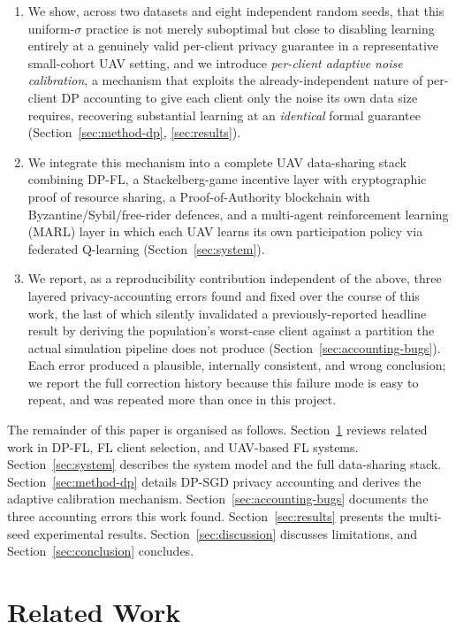 \documentclass[journal]{IEEEtran}
\begin{document}
\begin{enumerate}
\item We show, across two datasets and eight independent random seeds,
that this uniform-$\sigma$ practice is not merely suboptimal but close
to disabling learning entirely at a genuinely valid per-client privacy
guarantee in a representative small-cohort UAV setting, and we
introduce \emph{per-client adaptive noise calibration}, a mechanism
that exploits the already-independent nature of per-client DP
accounting to give each client only the noise its own data size
requires, recovering substantial learning at an \emph{identical} formal
guarantee (Section~\ref{sec:method-dp}, \ref{sec:results}).
\item We integrate this mechanism into a complete UAV data-sharing
stack combining DP-FL, a Stackelberg-game incentive layer with
cryptographic proof of resource sharing, a Proof-of-Authority
blockchain with Byzantine/Sybil/free-rider defences, and a multi-agent
reinforcement learning (MARL) layer in which each UAV learns its own
participation policy via federated Q-learning (Section~\ref{sec:system}).
\item We report, as a reproducibility contribution independent of the
above, three layered privacy-accounting errors found and fixed over the
course of this work, the last of which silently invalidated a
previously-reported headline result by deriving the population's
worst-case client against a partition the actual simulation pipeline
does not produce (Section~\ref{sec:accounting-bugs}). Each error
produced a plausible, internally consistent, and wrong conclusion; we
report the full correction history because this failure mode is easy
to repeat, and was repeated more than once in this project.
\end{enumerate}

The remainder of this paper is organised as follows. Section~\ref{sec:related}
reviews related work in DP-FL, FL client selection, and UAV-based FL
systems. Section~\ref{sec:system} describes the system model and the
full data-sharing stack. Section~\ref{sec:method-dp} details DP-SGD
privacy accounting and derives the adaptive calibration mechanism.
Section~\ref{sec:accounting-bugs} documents the three accounting errors
this work found. Section~\ref{sec:results} presents the multi-seed
experimental results. Section~\ref{sec:discussion} discusses limitations,
and Section~\ref{sec:conclusion} concludes.

\section{Related Work}
\label{sec:related}
\end{document}
